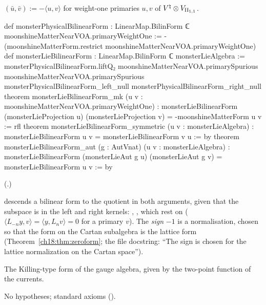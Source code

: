 \begin{definition}\label{ch18:def:monsterform}
$(\bar u,\bar v):=-\langle u,v\rangle$ for weight-one primaries $u,v$ of ${V^{\natural}}\otimes V_{\mathrm{II}_{1,1}}$.
\end{definition}
\begin{leancode}
def monsterPhysicalBilinearForm : LinearMap.BilinForm ℂ moonshineMatterNearVOA.primaryWeightOne :=
  -(moonshineMatterForm.restrict moonshineMatterNearVOA.primaryWeightOne)
def monsterLieBilinearForm : LinearMap.BilinForm ℂ monsterLieAlgebra :=
  monsterPhysicalBilinearForm.liftQ₂ moonshineMatterNearVOA.primarySpurious
    moonshineMatterNearVOA.primarySpurious
    monsterPhysicalBilinearForm_left_null monsterPhysicalBilinearForm_right_null
theorem monsterLieBilinearForm_mk (u v : moonshineMatterNearVOA.primaryWeightOne) :
    monsterLieBilinearForm (monsterLieProjection u) (monsterLieProjection v) =
      -moonshineMatterForm u v := rfl
theorem monsterLieBilinearForm_symmetric (u v : monsterLieAlgebra) :
    monsterLieBilinearForm u v = monsterLieBilinearForm v u := by
theorem monsterLieBilinearForm_aut (g : AutVnat) (u v : monsterLieAlgebra) :
    monsterLieBilinearForm (monsterLieAut g u) (monsterLieAut g v) =
      monsterLieBilinearForm u v := by
\end{leancode}
(.)
\begin{dictionary}
 descends a bilinear form to the quotient in both arguments, given that the subspace is in the left
and right kernels: , , which rest on
 ($\langle L_{-n}y,v\rangle=\langle y,L_nv\rangle=0$ for a primary $v$).  The
\emph{sign} $-1$ is a normalisation, chosen so that the form on the Cartan subalgebra is the lattice form
(Theorem~\ref{ch18:thm:zeroform}; the file docstring: ``The sign is chosen for the lattice normalization on the Cartan
space'').
\end{dictionary}
\begin{physics}The Killing-type form of the gauge algebra, given by the two-point function of the currents.\end{physics}
\begin{status}No hypotheses; standard axioms ().\end{status}

